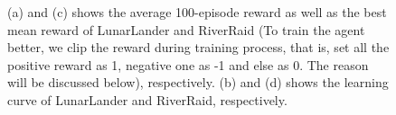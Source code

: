 \documentclass[12pt]{article}
\begin{document}
\begin{figure}[t]
\centering

%
%
\quad
{}%
%
\centering
\caption{\label{fig: curv}(a) and (c) shows the average 100-episode reward as well as the best mean reward of LunarLander and RiverRaid (To train the agent better, we clip the reward during training process, that is, set all the positive reward as 1, negative one as -1 and else as 0. The reason will be discussed below), respectively. (b) and (d) shows the learning curve of LunarLander and RiverRaid, respectively.}
\end{figure}
\end{document}
